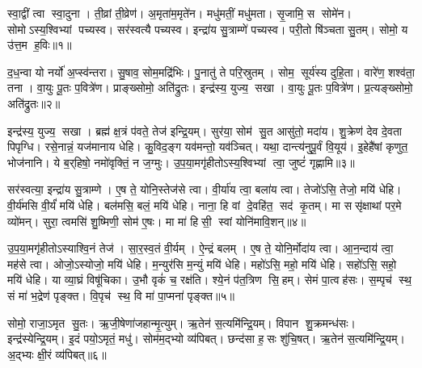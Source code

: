 \clearpage
{}
\setcounter{anuvakam}{0}

स्वा॒द्वीं त्वा स्वा॒दुना।
ती॒व्रां ती॒व्रेण॑।
अ॒मृता॑म॒मृते॑न।
मधु॑मतीं॒ मधु॑मता।
सृ॒जामि॒ स सोमे॑न।
सोमोऽस्य॒श्विभ्यां पच्यस्व।
सर॑स्वत्यै पच्यस्व।
इन्द्रा॑य सु॒त्राम्णे॑ पच्यस्व।
परी॒तो षि॑ञ्चता सु॒तम्।
सोमो॒ य उ॑त्त॒म ह॒विः॥१॥

द॒ध॒न्वा यो नर्यो॑ अ॒प्स्व॑न्तरा।
सु॒षाव॒ सोम॒मद्रि॑भिः।
पु॒नातु॑ ते परि॒स्रुतम्।
सोम॒ सूर्य॑स्य दुहि॒ता।
वारे॑ण॒ शश्व॑ता॒ तना।
वा॒युः पू॒तः प॒वित्रे॑ण।
प्राङ्ख्सोमो॒ अति॑द्रुतः।
इन्द्र॑स्य॒ युज्य॒ सखा।
वा॒युः पू॒तः प॒वित्रे॑ण।
प्र॒त्यङ्ख्सोमो॒ अति॑द्रुतः॥२॥

इन्द्र॑स्य॒ युज्य॒ सखा।
ब्रह्म॑ क्ष॒त्रं प॑वते॒ तेज॑ इन्द्रि॒यम्।
सुर॑या॒ सोम॑ सु॒त आसु॑तो॒ मदा॑य।
शु॒क्रेण॑ देव दे॒वता पिपृग्धि।
रसे॒नान्नं॒ यज॑मानाय धेहि।
कु॒विद॒ङ्ग यव॑मन्तो॒ यव॑ञ्चित्।
यथा॒ दान्त्य॑नुपू॒र्वं वि॒यूय॑।
इ॒हेहै॑षां कृणुत॒ भोज॑नानि।
ये ब॒र्‌हिषो॒ नमो॑वृक्तिं॒ न ज॒ग्मुः।
उ॒प॒या॒मगृ॑हीतोऽस्य॒श्विभ्यां त्वा॒ जुष्टं॑ गृह्णामि॥३॥

सर॑स्वत्या॒ इन्द्रा॑य सु॒त्राम्णे।
ए॒ष ते॒ योनि॒स्तेज॑से त्वा।
वी॒र्या॑य त्वा॒ बला॑य त्वा।
तेजो॑ऽसि॒ तेजो॒ मयि॑ धेहि।
वी॒र्य॑मसि वी॒र्यं॑ मयि॑ धेहि।
बल॑मसि॒ बलं॒ मयि॑ धेहि।
नाना॒ हि वां दे॒वहि॑त॒ सद॑ कृ॒तम्।
मा ससृ॑क्षाथां पर॒मे व्यो॑मन्।
सुरा॒ त्वमसि॑ शु॒ष्मिणी॒ सोम॑ ए॒षः।
मा मा॑ हिसी॒ स्वां योनि॑मावि॒शन्॥४॥

उ॒प॒या॒मगृ॑हीतोऽस्याश्वि॒नं तेज॑।
सा॒र॒स्व॒तं वी॒र्यम्।
ऐ॒न्द्रं बलम्।
ए॒ष ते॒ योनि॒र्मोदा॑य त्वा।
आ॒न॒न्दाय॑ त्वा॒ मह॑से त्वा।
ओजो॒ऽस्योजो॒ मयि॑ धेहि।
म॒न्युर॑सि म॒न्युं मयि॑ धेहि।
महो॑ऽसि॒ महो॒ मयि॑ धेहि।
सहो॑ऽसि॒ सहो॒ मयि॑ धेहि।
या व्या॒घ्रं विषू॑चिका।
उ॒भौ वृकं॑ च॒ रक्ष॑ति।
श्ये॒नं प॑त॒त्रिण सि॒हम्।
सेमं पा॒त्वह॑सः।
स॒म्पृच॑ स्थ॒ सं मा॑ भ॒द्रेण॑ पृङ्क्त।
वि॒पृच॑ स्थ॒ वि मा॑ पा॒प्मना॑ पृङ्क्त॥५॥\anuvakamend[ह॒विः प्र॒त्यङ्ख्सोमो॒ अति॑द्रुतो गृह्णाम्यावि॒शन्विषू॑चिका॒ पञ्च॑ च]

सोमो॒ राजा॒ऽमृत सु॒तः।
ऋ॒जी॒षेणा॑जहान्मृ॒त्युम्।
ऋ॒तेन॑ स॒त्यमि॑न्द्रि॒यम्।
विपान शु॒क्रमन्ध॑सः।
इन्द्र॑स्येन्द्रि॒यम्।
इ॒दं पयो॒ऽमृतं॒ मधु॑।
सोम॑म॒द्भ्यो व्य॑पिबत्।
छन्द॑सा ह॒सः शु॑चि॒षत्।
ऋ॒तेन॑ स॒त्यमि॑न्द्रि॒यम्।
अ॒द्भ्यः क्षी॒रं व्य॑पिबत्॥६॥

